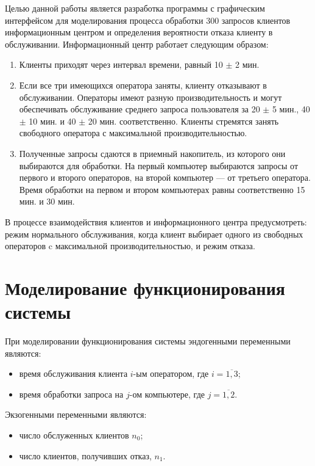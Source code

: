 
Целью данной работы является разработка программы с графическим интерфейсом для моделирования процесса обработки 300 запросов клиентов информационным центром и определения вероятности отказа клиенту в обслуживании. Информационный центр работает следующим образом:

\begin{enumerate}
	\item Клиенты приходят через интервал времени, равный 10 $\pm$ 2 мин.
	\item Если все три имеющихся оператора заняты, клиенту отказывают в обслуживании. Операторы имеют разную производительность и могут обеспечивать обслуживание среднего запроса пользователя за 20 $\pm$ 5 мин., 40 $\pm$ 10 мин. и 40 $\pm$ 20 мин. соответственно. Клиенты стремятся занять свободного оператора с максимальной производительностью.
	\item Полученные запросы сдаются в приемный накопитель, из которого они выбираются для обработки. На первый компьютер выбираются запросы от первого и второго операторов, на второй компьютер --- от третьего оператора. Время обработки на первом и втором компьютерах равны соответственно 15 мин. и 30 мин.
\end{enumerate}

В процессе взаимодействия клиентов и информационного центра предусмотреть: режим нормального обслуживания, когда клиент выбирает одного из свободных операторов c максимальной производительностью, и режим отказа.
 
\section*{Моделирование функционирования системы}

При моделировании функционирования системы эндогенными переменными являются:

\begin{itemize}
	\item время обслуживания клиента $i$-ым оператором, где $i = \overline{1, 3}$;	
	\item время обработки запроса на $j$-ом компьютере, где $j = \overline{1, 2}$.
\end{itemize}

\clearpage

Экзогенными переменными являются:

\begin{itemize}
	\item число обслуженных клиентов $n_{0}$;
	\item число клиентов, получивших отказ, $n_{1}$.
\end{itemize}

